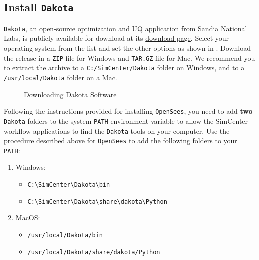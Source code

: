 \subsection{Install \texttt{Dakota}}

\href{http://dakota.sandia.gov}{\texttt{Dakota}}, an open-source  optimization and UQ application from Sandia National Labs, is publicly available for download at its \href{http://dakota.sandia.gov/download.html}{download page}. Select your operating system from the list and set the other options as shown in  . Download the release in a \texttt{ZIP} file for Windows and \texttt{TAR.GZ} file for Mac. We recommend you to extract the archive to a \texttt{C:/SimCenter/Dakota} folder on Windows, and to a \texttt{/usr/local/Dakota} folder on a Mac.

\begin{figure}[!htbp]
  \caption{Downloading Dakota Software}
  \label{fig:dakota_installation}
\end{figure}

Following the instructions provided for installing \texttt{OpenSees}, you need to add \textbf{two} \texttt{Dakota} folders to the system \texttt{PATH} environment variable to allow the SimCenter
workflow applications to find the \texttt{Dakota} tools on your computer. Use
the procedure described above for \texttt{OpenSees} to add the following
folders to your \texttt{PATH}:

\begin{enumerate}
\item Windows:
\begin{itemize}
    \item \texttt{C:\textbackslash SimCenter\textbackslash Dakota\textbackslash bin}
    \item \texttt{C:\textbackslash SimCenter\textbackslash Dakota\textbackslash share\textbackslash dakota\textbackslash Python}
\end{itemize}

\item MacOS:
\begin{itemize}
    \item \texttt{/usr/local/Dakota/bin}
    \item \texttt{/usr/local/Dakota/share/dakota/Python}
\end{itemize}
\end{enumerate}

